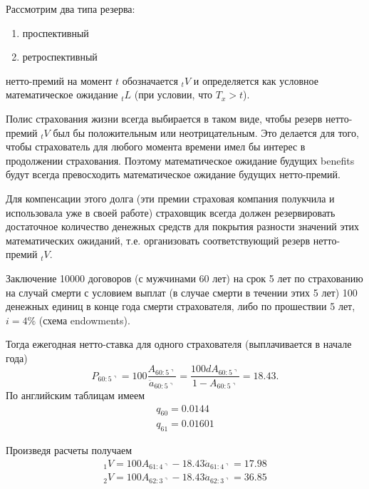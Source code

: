 Рассмотрим два типа резерва:
\begin{enumerate}
	\item проспективный
	\item ретроспективный
\end{enumerate}

\begin{definition}
	 нетто-премий на момент $ t$ обозначается $ {}_tV$ и определяется как условное математическое ожидание $ {}_tL$ (при условии, что $ T_x > t$).
\end{definition}

Полис страхования жизни всегда выбирается в таком виде, чтобы резерв нетто-премий $ {}_tV$ был бы положительным или неотрицательным. Это делается для того, чтобы страхователь для любого момента времени имел бы интерес в продолжении страхования. Поэтому математическое ожидание будущих benefits будут всегда превосходить математическое ожидание будущих нетто-премий.

Для компенсации этого долга (эти премии страховая компания полукчила и использовала уже в своей работе) страховщик всегда должен резервировать достаточное количество денежных средств для покрытия разности значений этих математических ожиданий, т.е. организовать соответствующий резерв нетто-премий $ {}_tV.$

\begin{example}
	Заключение 10000 договоров (с мужчинами 60 лет) на срок 5 лет по страхованию на случай смерти с условием выплат (в случае смерти в течении этих 5 лет) 100 денежных единиц в конце года смерти страхователя,  либо по прошествии 5 лет, $ i =4\%$  (схема endowments).

	Тогда ежегодная нетто-ставка для одного страхователя (выплачивается в начале года)
	\[  P_{60:5\urcorner}= 100 \frac{A_{60:5\urcorner}}{\ddot{a}_{60:5\urcorner}} = \frac{100dA_{60:5\urcorner}}{1-A_{60:5\urcorner}} = 18.43.\]
	По английским таблицам имеем
	\begin{gather*}
		q_{60} = 0.0144\\
		q_{61} = 0.01601
	\end{gather*}

	Произведя расчеты получаем
	\begin{gather*}
		{}_1V = 100A_{61:4\urcorner} - 18.43 \ddot{a}_{61:4\urcorner} = 17.98\\
		{}_2V = 100A_{62:3\urcorner} - 18.43 \ddot{a}_{62:3\urcorner} = 36.85\\
	\end{gather*}
\end{example}

